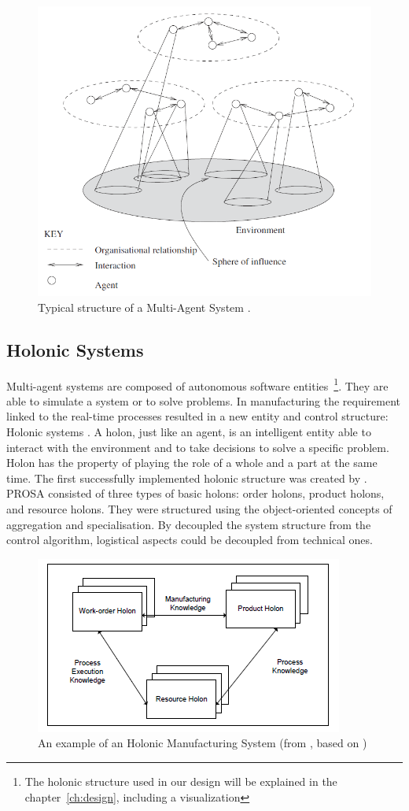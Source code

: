 \begin{figure}[h]
	\centering
	\includegraphics[width=0.7\linewidth]{./img/MAS_example}
	\caption{Typical structure of a Multi-Agent System \citep{wooldridge2009introduction}.}
	\label{fig:MAS_example}
\end{figure}

\subsection{Holonic Systems}
Multi-agent systems are composed of autonomous software entities~\footnote{The holonic structure used in our design will be explained in the chapter~\ref{ch:design}, including a visualization}. They are able to simulate a system or to solve problems. In manufacturing the requirement linked to the real-time processes resulted in a new entity and control structure: Holonic systems \citep{giret2005multi}. A holon, just like an agent, is an intelligent entity able to interact with the environment and to take decisions to solve a specific problem. Holon has the  property of playing the role of a whole and a part at the same time. The first successfully implemented holonic structure was created by \citep{van1998reference}. PROSA consisted of three types of basic holons: order holons, product holons, and resource holons. They were structured using the object-oriented concepts of aggregation and specialisation. By decoupled the system structure from the control algorithm, logistical aspects could be decoupled from technical ones. 
\begin{figure}[h]
\centering
\includegraphics[width=0.7\linewidth]{img/holonic_manufacturing}
\caption{An example of an Holonic Manufacturing System (from \citet{giret2005multi}, based on \citet{van1998reference})}
\label{fig:holonicmanufacturing}
\end{figure}

